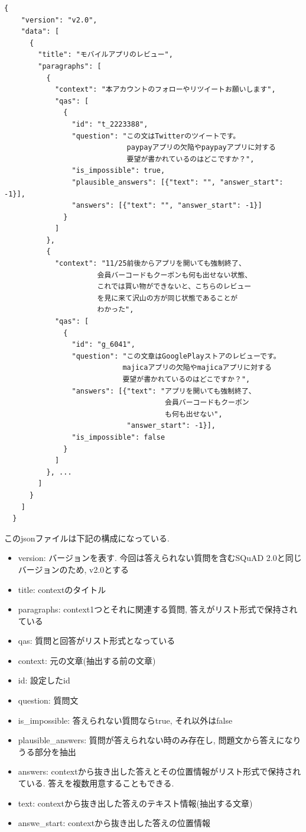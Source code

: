 \begin{lstlisting}[caption=データセット.json,label=json]
  {
    "version": "v2.0", 
    "data": [
      {
        "title": "モバイルアプリのレビュー", 
        "paragraphs": [
          {
            "context": "本アカウントのフォローやリツイートお願いします",
            "qas": [
              {
                "id": "t_2223388",
                "question": "この文はTwitterのツイートです。
                             paypayアプリの欠陥やpaypayアプリに対する
                             要望が書かれているのはどこですか？",
                "is_impossible": true,
                "plausible_answers": [{"text": "", "answer_start": -1}],
                "answers": [{"text": "", "answer_start": -1}]
              }
            ]
          },
          {
            "context": "11/25前後からアプリを開いても強制終了、
                      会員バーコードもクーポンも何も出せない状態、
                      これでは買い物ができないと、こちらのレビュー
                      を見に来て沢山の方が同じ状態であることが
                      わかった",
            "qas": [
              {
                "id": "g_6041", 
                "question": "この文章はGooglePlayストアのレビューです。
                            majicaアプリの欠陥やmajicaアプリに対する
                            要望が書かれているのはどこですか？",
                "answers": [{"text": "アプリを開いても強制終了、
                                      会員バーコードもクーポン
                                      も何も出せない", 
                             "answer_start": -1}], 
                "is_impossible": false
              }
            ]
          }, ...
        ]
      }
    ]
  } 
\end{lstlisting}

このjsonファイルは下記の構成になっている. 
\begin{itemize}
  \item version: バージョンを表す. 今回は答えられない質問を含むSQuAD 2.0と同じバージョンのため, v2.0とする
  \item title: contextのタイトル
  \item paragraphs: context1つとそれに関連する質問, 答えがリスト形式で保持されている
  \item qas: 質問と回答がリスト形式となっている
  \item context: 元の文章(抽出する前の文章)
  \item id: 設定したid
  \item question: 質問文
  \item is\_impossible: 答えられない質問ならtrue, それ以外はfalse
  \item plausible\_answers: 質問が答えられない時のみ存在し, 問題文から答えになりうる部分を抽出
  \item answers: contextから抜き出した答えとその位置情報がリスト形式で保持されている. 答えを複数用意することもできる. 
  \item text: contextから抜き出した答えのテキスト情報(抽出する文章)
  \item answe\_start: contextから抜き出した答えの位置情報
\end{itemize}

